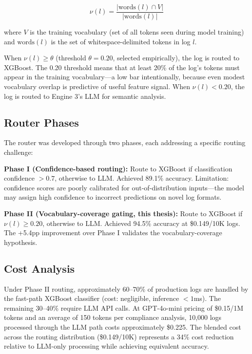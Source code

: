 \documentclass[12pt,oneside]{report}
\begin{document}
\begin{equation}
\nu(l) = \frac{|\text{words}(l) \cap V|}{|\text{words}(l)|}
\label{eq:vocabulary_coverage}
\end{equation}

where $V$ is the training vocabulary (set of all tokens seen during model training) and $\text{words}(l)$ is the set of whitespace-delimited tokens in log $l$.

When $\nu(l) \geq \theta$ (threshold $\theta = 0.20$, selected empirically), the log is routed to XGBoost. The 0.20 threshold means that at least 20\% of the log's tokens must appear in the training vocabulary—a low bar intentionally, because even modest vocabulary overlap is predictive of useful feature signal. When $\nu(l) < 0.20$, the log is routed to Engine 3's LLM for semantic analysis.

\subsection{Router Phases}

The router was developed through two phases, each addressing a specific routing challenge:

\textbf{Phase I (Confidence-based routing):} Route to XGBoost if classification confidence $> 0.7$, otherwise to LLM. Achieved 89.1\% accuracy. Limitation: confidence scores are poorly calibrated for out-of-distribution inputs—the model may assign high confidence to incorrect predictions on novel log formats.

\textbf{Phase II (Vocabulary-coverage gating, this thesis):} Route to XGBoost if $\nu(l) \geq 0.20$, otherwise to LLM. Achieved 94.5\% accuracy at \$0.149/10K logs. The +5.4pp improvement over Phase I validates the vocabulary-coverage hypothesis.

\subsection{Cost Analysis}

Under Phase II routing, approximately 60--70\% of production logs are handled by the fast-path XGBoost classifier (cost: negligible, inference $< 1$ms). The remaining 30--40\% require LLM API calls. At GPT-4o-mini pricing of \$0.15/1M tokens and an average of 150 tokens per compliance analysis, 10,000 logs processed through the LLM path costs approximately \$0.225. The blended cost across the routing distribution (\$0.149/10K) represents a 34\% cost reduction relative to LLM-only processing while achieving equivalent accuracy.
\end{document}

